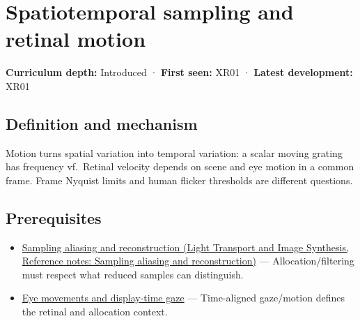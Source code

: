 \hypertarget{appendix-70895739febb}{}\label{referencestart:appendix-70895739febb}
\section{Spatiotemporal sampling and retinal motion}\label{appendix-70895739febb-spatiotemporal-sampling-and-retinal-motion}

\hypertarget{appendix-70895739febb-spatiotemporal-sampling-and-retinal-motion}{}

\textbf{Curriculum depth:} Introduced · \textbf{First seen:} XR01 · \textbf{Latest development:} XR01

\begin{allmightroledefinition}

\subsection{Definition and mechanism}\label{appendix-70895739febb-definition-and-mechanism}

\hypertarget{appendix-70895739febb-definition-and-mechanism}{}

Motion turns spatial variation into temporal variation: a scalar moving grating has frequency \textbar v\textbar f.~Retinal velocity depends on scene and eye motion in a common frame. Frame Nyquist limits and human flicker thresholds are different questions.

\end{allmightroledefinition}

\subsection{Prerequisites}\label{appendix-70895739febb-prerequisites}

\hypertarget{appendix-70895739febb-prerequisites}{}

\begin{itemize}
\tightlist
\item
  \href{../04-Light-Transport-and-Image-Synthesis/main.pdf\#nameddest=appendix-6a7869dd79a6}{Sampling aliasing and reconstruction (Light Transport and Image Synthesis, Reference notes: Sampling aliasing and reconstruction)} --- Allocation/filtering must respect what reduced samples can distinguish.
\item
  \hyperref[appendix-a6f2c4fe1996]{Eye movements and display-time gaze} --- Time-aligned gaze/motion defines the retinal and allocation context.
\end{itemize}

